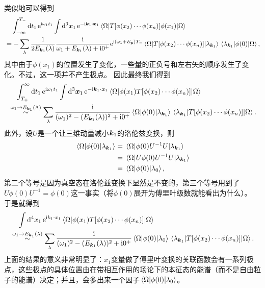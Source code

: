 \documentclass[hyperref, UTF8, a4paper]{ctexart}
\newcommand*{\ii}{\mathrm{i}}
\newcommand*{\ee}{\mathrm{e}}
\begin{document}
类似地可以得到
\[
    \begin{aligned}
        &\quad \int_{-\infty}^{T_-} \dd{t_1} \ee^{\ii \omega_1 t_1} \int \dd[3]{\vb*{x}_1} \ee^{- \ii \vb*{k}_1 \cdot \vb*{x}_1} \mel{\Omega}{T [\phi(x_2) \cdots \phi(x_n)] \phi(x_1)}{\Omega} \\
        &= - \sum_{\lambda} \frac{1}{2E_{\vb*{k}_1}(\lambda)} \frac{\ii}{\omega_1 + E_{\vb*{k}_1}(\lambda) + \ii 0^+} \ee^{\ii (\omega_1 + E_{\vb*{p}}) T_-} \mel*{\Omega}{T [\phi(x_2) \cdots \phi(x_n)]}{\lambda_{\vb*{k}_1}} \mel*{\lambda_{\vb*{k}_1}}{\phi(0)}{\Omega},
    \end{aligned}
\]
其中由于$\phi(x_1)$的位置发生了变化，一些量的正负号和左右矢的顺序发生了变化。不过，这一项并不产生极点。
因此最终我们得到
\[
    \begin{aligned}
        &\quad \int_{T_+}^{\infty} \dd{t_1} \ee^{\ii \omega_1 t_1} \int \dd[3]{\vb*{x}_1} \ee^{- \ii \vb*{k}_1 \cdot \vb*{x}_1} \mel{\Omega}{\phi(x_1) T [\phi(x_2) \cdots \phi(x_n)]}{\Omega} \\
        &\stackrel{\omega_1 \to E_{\vb*{k}_1}(\Lambda)}{\sim} \sum_{\lambda} \frac{\ii}{(\omega_1)^2 - (E_{\vb*{k}_1}(\lambda))^2 + \ii 0^+} \mel*{\Omega}{\phi(0)}{\lambda_{\vb*{k}_1}} \mel*{\lambda_{\vb*{k}_1}}{T [\phi(x_2) \cdots \phi(x_n)]}{\Omega}.
    \end{aligned}
\]
此外，设$U$是一个让三维动量减小$\vb*{k}_1$的洛伦兹变换，则
\[
    \begin{aligned}
        \mel*{\Omega}{\phi(0)}{\lambda_{\vb*{k}_1}} &= \mel*{\Omega}{\phi(0)U^{-1} U}{\lambda_{\vb*{k}_1}} \\
        &= \mel*{\Omega}{U \phi(0)U^{-1} U}{\lambda_{\vb*{k}_1}} \\
        &= \mel*{\Omega}{\phi(0)}{\lambda_0},
    \end{aligned}
\]
第二个等号是因为真空态在洛伦兹变换下显然是不变的，第三个等号用到了$U \phi(0) U^{-1} = \phi(0)$这一事实（将$\phi(0)$展开为傅里叶级数就能看出为什么）。
于是就得到
\[
    \begin{aligned}
        &\quad \int \dd[4]{x_1} \ee^{\ii k_1 \cdot x_1} \mel{\Omega}{\phi(x_1) T [\phi(x_2) \cdots \phi(x_n)]}{\Omega} \\
        &\stackrel{\omega_1 \to E_{\vb*{k}_1}(\lambda)}{\sim} \sum_{\lambda} \frac{\ii}{(\omega_1)^2 - (E_{\vb*{k}_1}(\lambda))^2 + \ii 0^+} \mel*{\Omega}{\phi(0)}{\lambda_{0}} \mel*{\lambda_{\vb*{k}_1}}{T [\phi(x_2) \cdots \phi(x_n)]}{\Omega}.
    \end{aligned}
\]
上面的结果的意义非常明显了：$x_1$变量做了傅里叶变换的关联函数会有一系列极点，这些极点的具体位置由在带相互作用的场论下的本征态的能谱（而不是自由粒子的能谱）决定；并且，会多出来一个因子$\mel*{\Omega}{\phi(0)}{\lambda_{0}}$。
\end{document}
